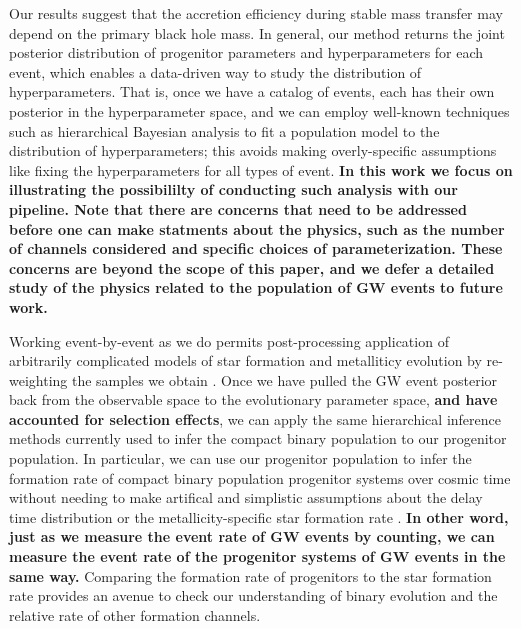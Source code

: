 \documentclass[twocolumn]{aastex631}
\begin{document}
Our results suggest that the accretion efficiency during stable mass transfer
may depend on the primary black hole mass.  In general, our method returns the
joint posterior distribution of progenitor parameters and hyperparameters for
each event, which enables a data-driven way to study the distribution of
hyperparameters.  That is, once we have a catalog of events, each has their own
posterior in the hyperparameter space, and we can employ well-known techniques
such as hierarchical Bayesian analysis to fit a population model to the
distribution of hyperparameters; this avoids making overly-specific assumptions
like fixing the hyperparameters for all types of event. \textbf{In this work we
focus on illustrating the possibililty of conducting such analysis with our
pipeline. Note that there are concerns that need to be addressed before one can
make statments about the physics, such as the number of channels considered and
specific choices of parameterization. These concerns are beyond the scope of
this paper, and we defer a detailed study of the physics related to the
population of GW events to future work.}

Working event-by-event as we do permits post-processing application of
arbitrarily complicated models of star formation and metalliticy evolution by
re-weighting the samples we obtain \citep[e.g.][]{VanSon2022}. Once we have
pulled the GW event posterior back from the observable space to the evolutionary
parameter space, \textbf{and have accounted for selection effects}, we can apply
the same hierarchical inference methods currently used to infer the compact
binary population to our progenitor population.  In particular, we can use our
progenitor population to infer the formation rate of compact binary population
progenitor systems over cosmic time without needing to make artifical and
simplistic assumptions about the delay time distribution or the
metallicity-specific star formation rate \citep{Vitale2019,Ng2021,VanSon2022}.
\textbf{In other word, just as we measure the event rate of GW events by
counting, we can measure the event rate of the progenitor systems of GW events
in the same way.} Comparing the formation rate of progenitors to the star
formation rate provides an avenue to check our understanding of binary evolution
and the relative rate of other formation channels.
\end{document}
